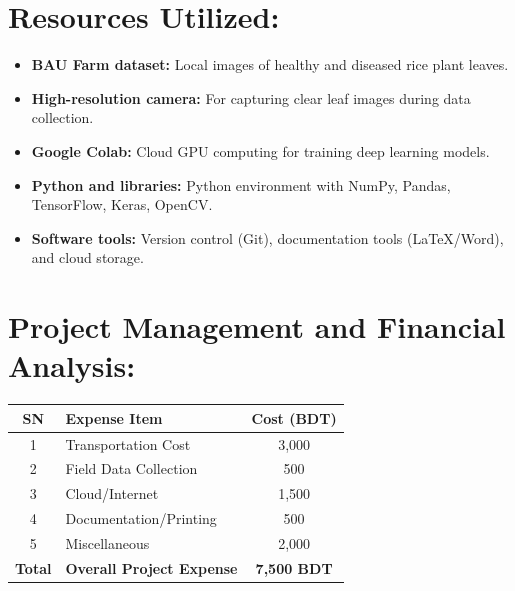 \documentclass[11pt,a4paper]{article}
\begin{document}
\section{Resources Utilized:}
\begin{itemize}[leftmargin=*]
    \item \textbf{BAU Farm dataset:} Local images of healthy and diseased rice plant leaves.
    \item \textbf{High-resolution camera:} For capturing clear leaf images during data collection.
    \item \textbf{Google Colab:} Cloud GPU computing for training deep learning models.
    \item \textbf{Python and libraries:} Python environment with NumPy, Pandas, TensorFlow, Keras, OpenCV.
    \item \textbf{Software tools:} Version control (Git), documentation tools (LaTeX/Word), and cloud storage.
\end{itemize}

\section{Project Management and Financial Analysis:}
\begin{table}[h!]
\centering
\renewcommand{\arraystretch}{1.3}
\begin{tabularx}{\textwidth}{|c|X|c|}
\hline
\textbf{SN} & \textbf{Expense Item} & \textbf{Cost (BDT)} \\ \hline
1 & Transportation Cost & 3,000 \\ \hline
2 & Field Data Collection & 500 \\ \hline
3 & Cloud/Internet & 1,500 \\ \hline
4 & Documentation/Printing & 500 \\ \hline
5 & Miscellaneous & 2,000 \\ \hline
\textbf{Total} & \textbf{Overall Project Expense} & \textbf{7,500 BDT} \\ \hline
\end{tabularx}
\end{table}

\end{document}
